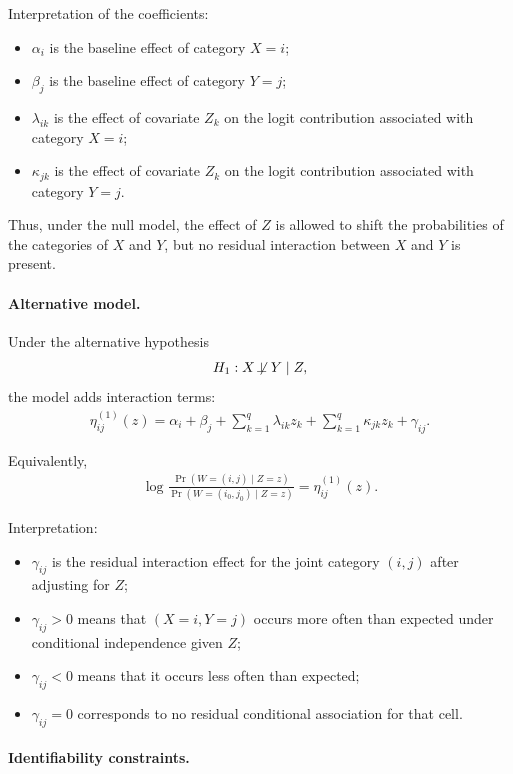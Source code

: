 \documentclass[11pt,a4paper]{article}
\begin{document}
Interpretation of the coefficients:
\begin{itemize}
\item $\alpha_i$ is the baseline effect of category $X=i$;
\item $\beta_j$ is the baseline effect of category $Y=j$;
\item $\lambda_{ik}$ is the effect of covariate $Z_k$ on the logit contribution associated with category $X=i$;
\item $\kappa_{jk}$ is the effect of covariate $Z_k$ on the logit contribution associated with category $Y=j$.
\end{itemize}

Thus, under the null model, the effect of $Z$ is allowed to shift the probabilities of the categories of $X$ and $Y$, but no residual interaction between $X$ and $Y$ is present.

\paragraph{Alternative model.}

Under the alternative hypothesis
\begin{align}
H_1: X \not\!\perp Y \mid Z,
\end{align}
the model adds interaction terms:
\begin{align}
\eta^{(1)}_{ij}(z)
=
\alpha_i + \beta_j
+ \sum_{k=1}^q \lambda_{ik} z_k
+ \sum_{k=1}^q \kappa_{jk} z_k
+ \gamma_{ij}.
\end{align}

Equivalently,
\begin{align}
\log\frac{\Pr(W=(i,j)\mid Z=z)}{\Pr(W=(i_0,j_0)\mid Z=z)}
=
\eta^{(1)}_{ij}(z).
\end{align}

Interpretation:
\begin{itemize}
\item $\gamma_{ij}$ is the residual interaction effect for the joint category $(i,j)$ after adjusting for $Z$;
\item $\gamma_{ij} > 0$ means that $(X=i,Y=j)$ occurs more often than expected under conditional independence given $Z$;
\item $\gamma_{ij} < 0$ means that it occurs less often than expected;
\item $\gamma_{ij} = 0$ corresponds to no residual conditional association for that cell.
\end{itemize}

\paragraph{Identifiability constraints.}
\end{document}
